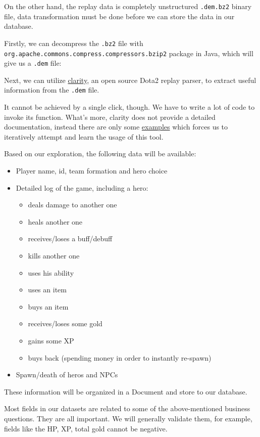 \documentclass{article}
\newcommand{\codeinline}[1]{
	\texttt{#1}
}
\begin{document}
On the other hand, the replay data is completely unstructured \codeinline{.dem.bz2} binary file,
data transformation must be done before we can store the data in our database.

Firstly, we can decompress the \codeinline{.bz2} file with \codeinline{org.apache.commons.compress.compressors.bzip2} package in Java,
which will give us a \codeinline{.dem} file:

Next, we can utilize \href{https://github.com/skadistats/clarity}{clarity},
an open source Dota2 replay parser, to extract useful information from the \codeinline{.dem} file.

It cannot be achieved by a single click, though. We have to write a lot of code to invoke its function.
What's more, clarity does not provide a detailed documentation, instead there are only some \href{https://github.com/skadistats/clarity-examples}{examples} which forces us to iteratively attempt and learn the usage of this tool.

Based on our exploration, the following data will be available:

\begin{itemize}
	\item Player name, id, team formation and hero choice
	\item Detailed log of the game, including a hero:
	\begin{itemize}
		\item deals damage to another one
		\item heals another one
		\item receives/loses a buff/debuff
		\item kills another one
		\item uses his ability
		\item uses an item
		\item buys an item
		\item receives/loses some gold
		\item gains some XP
		\item buys back (spending money in order to instantly re-spawn)
	\end{itemize}
	\item Spawn/death of heros and NPCs
\end{itemize}

These information will be organized in a Document and store to our database.

Most fields in our datasets are related to some of the above-mentioned business questions.
They are all important.
We will generally validate them, for example, fields like the HP, XP, total gold cannot be negative.
\end{document}

